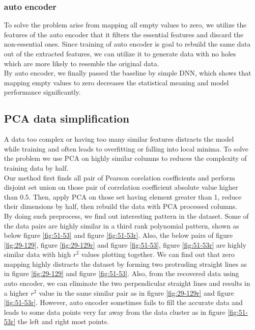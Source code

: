 \documentclass[12pt,a4paper]{article}
\begin{document}
\subsubsection{auto encoder}
To solve the problem arise from mapping all empty values to zero, we utilize the features of the auto encoder that it filters the essential features and discard the non-essential ones.
Since training of auto encoder is goal to rebuild the same data out of the extracted features, we can utilize it to generate data with no holes which are more likely to resemble the original data. \\
By auto encoder, we finally passed the baseline by simple DNN, which shows that mapping empty values to zero decreases the statistical meaning and model performance significantly.


\subsection{PCA data simplification}
A data too complex or having too many similar features distracts the model while training and often leads to overfitting or falling into local minima.
To solve the problem we use PCA on highly similar columns to reduces the complexity of training data by half. \\

Our method first finds all pair of Pearson corelation coefficients and perform disjoint set union on those pair of correlation coefficient absolute value higher than $0.5$.
Then, apply PCA on those set having element greater than 1, reduce their dimensions by half, then rebuild the data with PCA processed columns. \\

By doing such preprocess, we find out interesting pattern in the dataset.
Some of the data pairs are highly similar in a third rank polynomial pattern, shown as below figure \ref{fig:51-53} and figure \ref{fig:51-53r}.
Also, the below pairs of figure \ref{fig:29-129}, figure \ref{fig:29-129r} and figure \ref{fig:51-53}, figure \ref{fig:51-53r} are highly similar data with high $r^2$ values plotting together.
We can find out that zero mapping highly distracts the dataset by forming two protruding straight lines as in figure \ref{fig:29-129} and figure \ref{fig:51-53}.
Also, from the recovered data using auto encoder, we can eliminate the two perpendicular straight lines and results in a higher $r^2$ value in the same similar pair as in figure \ref{fig:29-129r} and figure \ref{fig:51-53r}.
However, auto encoder sometimes fails to fill the accurate data and leads to some data points very far away from the data cluster as in figure \ref{fig:51-53r} the left and right most points.
\end{document}
